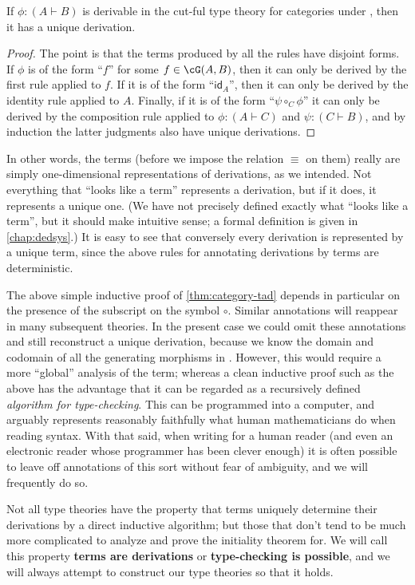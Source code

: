 \documentclass{book}
\def\idfunc{\mathsf{id}}
\let\types\vdash
\def\comp#1{\circ_{#1}}
\begin{document}
\begin{lem}\label{thm:category-tad}
  If $\phi :(A\types B)$ is derivable in the cut-ful type theory for categories under \cG, then it has a unique derivation.
\end{lem}
\begin{proof}
  The point is that the terms produced by all the rules have disjoint forms.
  If $\phi$ is of the form ``$f$'' for some $f\in\cG(A,B)$, then it can only be derived by the first rule applied to $f$.
  If it is of the form ``$\idfunc_A$'', then it can only be derived by the identity rule applied to $A$.
  Finally, if it is of the form ``$\psi\comp{C}\phi$'' it can only be derived by the composition rule applied to $\phi:(A\types C)$ and $\psi:(C\types B)$, and by induction the latter judgments also have unique derivations.
\end{proof}

In other words, the terms (before we impose the relation $\equiv$ on them) really are simply one-dimensional representations of derivations, as we intended.
Not everything that ``looks like a term'' represents a derivation, but if it does, it represents a unique one.
(We have not precisely defined exactly what ``looks like a term'', but it should make intuitive sense; a formal definition is given in \cref{chap:dedsys}.)
It is easy to see that conversely every derivation is represented by a unique term, since the above rules for annotating derivations by terms are deterministic.

The above simple inductive proof of \cref{thm:category-tad} depends in particular on the presence of the subscript on the symbol $\circ$.
Similar annotations will reappear in many subsequent theories.
In the present case we could omit these annotations and still reconstruct a unique derivation, because we know the domain and codomain of all the generating morphisms in \cG.
However, this would require a more ``global'' analysis of the term; whereas a clean inductive proof such as the above has the advantage that it can be regarded as a recursively defined \emph{algorithm for type-checking}.
This can be programmed into a computer, and arguably represents reasonably faithfully what human mathematicians do when reading syntax.
With that said, when writing for a human reader (and even an electronic reader whose programmer has been clever enough) it is often possible to leave off annotations of this sort without fear of ambiguity, and we will frequently do so.

Not all type theories have the property that terms uniquely determine their derivations by a direct inductive algorithm; but those that don't tend to be much more complicated to analyze and prove the initiality theorem for.
We will call this property \textbf{terms are derivations} or \textbf{type-checking is possible}, and we will always attempt to construct our type theories so that it holds.
\end{document}
